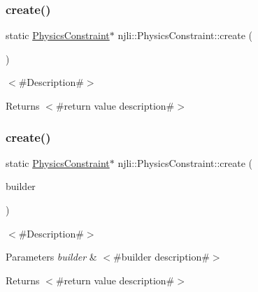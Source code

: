 \subsubsection{\texorpdfstring{create()}{create()}\hspace{0.1cm}{\footnotesize\ttfamily [2/3]}}
{\footnotesize\ttfamily static \mbox{\hyperlink{classnjli_1_1_physics_constraint}{Physics\+Constraint}}$\ast$ njli\+::\+Physics\+Constraint\+::create (\begin{DoxyParamCaption}{ }\end{DoxyParamCaption})\hspace{0.3cm}{\ttfamily [static]}}

$<$\#\+Description\#$>$

\begin{DoxyReturn}{Returns}
$<$\#return value description\#$>$ 
\end{DoxyReturn}
\mbox{\label{classnjli_1_1_physics_constraint_ab3c5d215f3df6f2ae6f6d1492114449b}} 
\subsubsection{\texorpdfstring{create()}{create()}\hspace{0.1cm}{\footnotesize\ttfamily [3/3]}}
{\footnotesize\ttfamily static \mbox{\hyperlink{classnjli_1_1_physics_constraint}{Physics\+Constraint}}$\ast$ njli\+::\+Physics\+Constraint\+::create (\begin{DoxyParamCaption}\item[{const \mbox{\hyperlink{classnjli_1_1_physics_constraint_builder}{Physics\+Constraint\+Builder}} \&}]{builder }\end{DoxyParamCaption})\hspace{0.3cm}{\ttfamily [static]}}

$<$\#\+Description\#$>$


\begin{DoxyParams}{Parameters}
{\em builder} & $<$\#builder description\#$>$\\
\hline
\end{DoxyParams}
\begin{DoxyReturn}{Returns}
$<$\#return value description\#$>$ 
\end{DoxyReturn}
\mbox{\label{classnjli_1_1_physics_constraint_a4d77bf76586344a445393a05f3295cb0}} 
